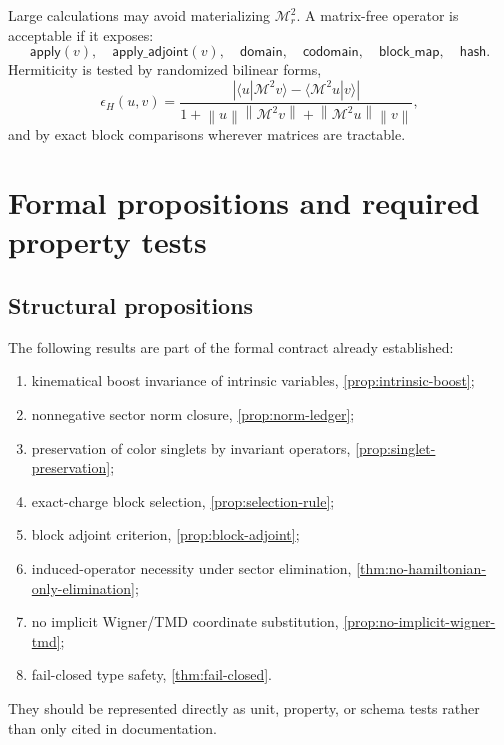 \documentclass[11pt]{article}
\newcommand{\cM}{\mathcal M}
\newcommand{\abs}[1]{\left|#1\right|}
\newcommand{\norm}[1]{\left\lVert#1\right\rVert}
\begin{document}
Large calculations may avoid materializing \(\cM_r^2\).  A matrix-free
operator is acceptable if it exposes:
\begin{equation}
 \mathsf{apply}(v),\quad
 \mathsf{apply\_adjoint}(v),\quad
 \mathsf{domain},\quad
 \mathsf{codomain},\quad
 \mathsf{block\_map},\quad
 \mathsf{hash}.
\label{eq:matrix-free-interface}
\end{equation}
Hermiticity is tested by randomized bilinear forms,
\begin{equation}
 \epsilon_H(u,v)
 =\frac{\abs{\langle u|\cM^2v\rangle
 -\langle\cM^2u|v\rangle}}
 {1+\norm{u}\norm{\cM^2v}+\norm{\cM^2u}\norm{v}},
\label{eq:random-hermiticity-test}
\end{equation}
and by exact block comparisons wherever matrices are tractable.

\section{Formal propositions and required property tests}
\label{sec:tests}

\subsection{Structural propositions}

The following results are part of the formal contract already established:
\begin{enumerate}
\item kinematical boost invariance of intrinsic variables,
\cref{prop:intrinsic-boost};
\item nonnegative sector norm closure, \cref{prop:norm-ledger};
\item preservation of color singlets by invariant operators,
\cref{prop:singlet-preservation};
\item exact-charge block selection, \cref{prop:selection-rule};
\item block adjoint criterion, \cref{prop:block-adjoint};
\item induced-operator necessity under sector elimination,
\cref{thm:no-hamiltonian-only-elimination};
\item no implicit Wigner/TMD coordinate substitution,
\cref{prop:no-implicit-wigner-tmd};
\item fail-closed type safety, \cref{thm:fail-closed}.
\end{enumerate}
They should be represented directly as unit, property, or schema tests rather
than only cited in documentation.
\end{document}
